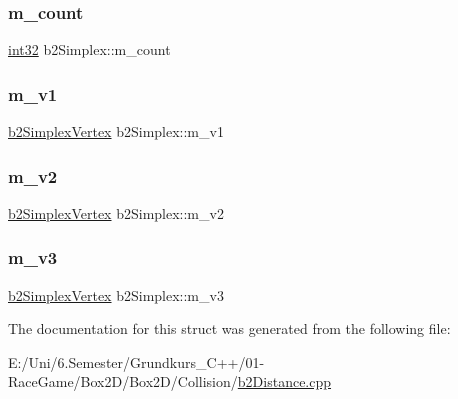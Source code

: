 \subsubsection{\texorpdfstring{m\_count}{m\_count}}
{\footnotesize\ttfamily \mbox{\hyperlink{b2_settings_8h_a43d43196463bde49cb067f5c20ab8481}{int32}} b2\+Simplex\+::m\+\_\+count}

\mbox{\label{structb2_simplex_a974d030fe572112e6d5212520586eb13}} 
\subsubsection{\texorpdfstring{m\_v1}{m\_v1}}
{\footnotesize\ttfamily \mbox{\hyperlink{structb2_simplex_vertex}{b2\+Simplex\+Vertex}} b2\+Simplex\+::m\+\_\+v1}

\mbox{\label{structb2_simplex_a1732c0f9d63e7cdbd405e7a7b2c7b7cb}} 
\subsubsection{\texorpdfstring{m\_v2}{m\_v2}}
{\footnotesize\ttfamily \mbox{\hyperlink{structb2_simplex_vertex}{b2\+Simplex\+Vertex}} b2\+Simplex\+::m\+\_\+v2}

\mbox{\label{structb2_simplex_a42ede9ec641aea34e51baf1b43e9ea07}} 
\subsubsection{\texorpdfstring{m\_v3}{m\_v3}}
{\footnotesize\ttfamily \mbox{\hyperlink{structb2_simplex_vertex}{b2\+Simplex\+Vertex}} b2\+Simplex\+::m\+\_\+v3}



The documentation for this struct was generated from the following file\+:\begin{DoxyCompactItemize}
\item 
E\+:/\+Uni/6.\+Semester/\+Grundkurs\+\_\+\+C++/01-\/\+Race\+Game/\+Box2\+D/\+Box2\+D/\+Collision/\mbox{\hyperlink{b2_distance_8cpp}{b2\+Distance.\+cpp}}\end{DoxyCompactItemize}
